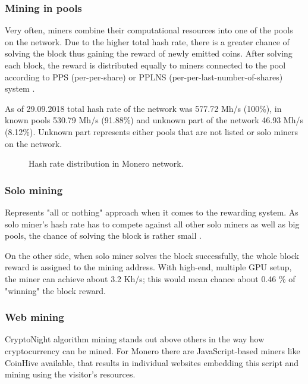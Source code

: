 \documentclass[
  printed, %
  table,   %
  nolof,     %
  nolot,     %
           oneside, color
]{fithesis3}
\begin{document}
\subsubsection{Mining in pools}
Very often, miners combine their computational resources into one of the pools on the network. Due to the higher total hash rate, there is a greater chance of solving the block thus gaining the reward of newly emitted coins. After solving each block, the reward is distributed equally to miners connected to the pool according to PPS (per-per-share) or PPLNS (per-per-last-number-of-shares) system \cite{tarasiewicz2015cryptocurrencies}.

As of 29.09.2018 total hash rate of the network was 577.72 Mh/s (100\%), in known pools 530.79 Mh/s (91.88\%) and unknown part of the network 46.93 Mh/s (8.12\%). Unknown part represents either pools that are not listed or solo miners on the network.


\begin{figure}[H]
\begin{center}
     \end{center}
      \caption{Hash rate distribution in Monero network.}
      \label{chart:range}

\end{figure}
\subsubsection{Solo mining}
Represents "all or nothing" approach when it comes to the rewarding system. As solo miner's hash rate has to compete against all other solo miners as well as big pools, the chance of solving the block is rather small \cite{cong2018decentralized}.

On the other side, when solo miner solves the block successfully, the whole block reward is assigned to the mining address. With high-end, multiple GPU setup, the miner can achieve about 3.2 Kh/s; this would mean chance about 0.46 \% of "winning" the block reward. 

\subsubsection{Web mining}
CryptoNight algorithm mining stands out above others in the way how cryptocurrency can be mined. For Monero there are JavaScript-based miners like CoinHive available, that results in individual websites embedding this script and mining using the visitor's resources. 
\end{document}
